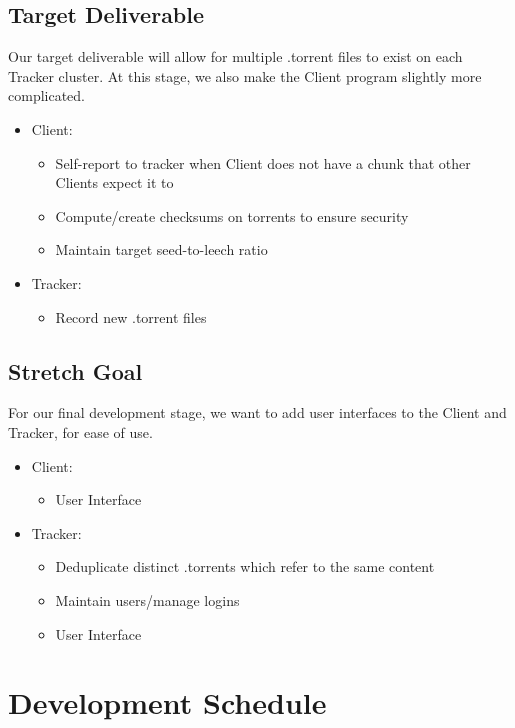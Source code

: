 \documentclass[12pt]{article}
\begin{document}
\subsection*{Target Deliverable}
Our target deliverable will allow for multiple .torrent files to exist on
each Tracker cluster.
At this stage, we also make the Client program slightly more complicated.

\begin{itemize}
\item  Client:
    \begin{itemize}
    \item  Self-report to tracker when Client does not have a chunk that other
           Clients expect it to
    \item  Compute/create checksums on torrents to ensure security
    \item  Maintain target seed-to-leech ratio
    \end{itemize}
\item  Tracker:
    \begin{itemize}
    \item  Record new .torrent files
    \end{itemize}
\end{itemize}

\subsection*{Stretch Goal}
For our final development stage, we want to add user interfaces to the Client
and Tracker, for ease of use.

\begin{itemize}
\item  Client:
    \begin{itemize}
    \item  User Interface
    \end{itemize}
\item  Tracker:
    \begin{itemize}
    \item  Deduplicate distinct .torrents which refer to the same content
    \item  Maintain users/manage logins
    \item  User Interface
    \end{itemize}
\end{itemize}

\section*{Development Schedule}
\end{document}
